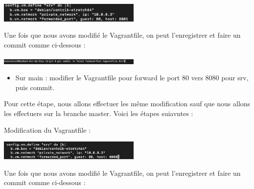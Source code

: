 \documentclass[12pt]{article}
\begin{document}
\begin{center}
  \includegraphics[width=7cm]{Images-TD-Git/Image-TD-Git-4/Forward-port.png}
\end{center}

\vspace{0.3cm}

Une fois que nous avons modifié le Vagrantfile, on peut l'enregistrer et faire un commit comme ci-dessous :

\vspace{0.3cm}

\begin{center}
  \includegraphics[width=7cm]{Images-TD-Git/Image-TD-Git-4/commit-1.png}
\end{center}

\vspace{0.3cm}

\begin{itemize}
  \item Sur main : modifier le Vagrantfile pour forward le port 80 vers 8080 pour srv, puis commit.
\end{itemize}

\vspace{0.3cm}

Pour cette étape, nous allons effectuer les même modification sauf que nous allons les effectuers sur la branche master. Voici les étapes suiavntes : 

\vspace{0.3cm}

\vspace{0.3cm}

Modification du Vagrantfile : 

\vspace{0.3cm}

\begin{center}
  \includegraphics[width=7cm]{Images-TD-Git/Image-TD-Git-4/Forward-port-2.png}
\end{center}

\vspace{0.3cm}

Une fois que nous avons modifié le Vagrantfile, on peut l'enregistrer et faire un commit comme ci-dessous :
\end{document}
